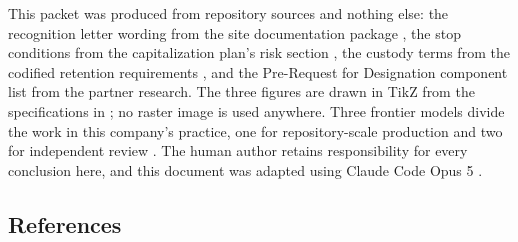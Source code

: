 This packet was produced from repository sources and nothing else: the
recognition letter wording from the site documentation package
\cite{movein2026}, the stop conditions from the capitalization plan's risk
section \cite{capitalplan2026}, the custody terms from the codified retention
requirements \cite{ecfr2026part312records}, and the Pre-Request for Designation
component list from the partner research. The three figures are drawn in TikZ
from the specifications in ; no
raster image is used anywhere. Three frontier models divide the work in this
company's practice, one for repository-scale production and two for independent
review \cite{tripartisan2026}. The human author retains responsibility for every
conclusion here, and this document was adapted using Claude Code Opus 5
\cite{repo2026}.

\subsection{References}

\begin{apprefs}


\end{apprefs}
